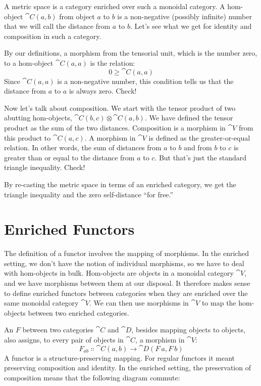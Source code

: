 A metric space is a category enriched over such a monoidal category. A
hom-object $\cat{C}(a, b)$ from object $a$ to $b$ is a
non-negative (possibly infinite) number that we will call the distance
from $a$ to $b$. Let's see what we get for identity and
composition in such a category.

By our definitions, a morphism from the tensorial unit, which is the
number zero, to a hom-object $\cat{C}(a, a)$ is the relation:
\[0 \geqslant \cat{C}(a, a)\]
Since $\cat{C}(a, a)$ is a non-negative number, this condition tells
us that the distance from $a$ to $a$ is always zero.
Check!

Now let's talk about composition. We start with the tensor product of
two abutting hom-objects, $\cat{C}(b, c) \otimes \cat{C}(a, b)$. We have defined
the tensor product as the sum of the two distances. Composition is a
morphism in $\cat{V}$ from this product to $\cat{C}(a, c)$. A morphism
in $\cat{V}$ is defined as the greater-or-equal relation. In other words,
the sum of distances from $a$ to $b$ and from $b$
to $c$ is greater than or equal to the distance from $a$
to $c$. But that's just the standard triangle inequality. Check!

By re-casting the metric space in terms of an enriched category, we get
the triangle inequality and the zero self-distance ``for free.''

\section{Enriched Functors}

The definition of a functor involves the mapping of morphisms. In the
enriched setting, we don't have the notion of individual morphisms, so
we have to deal with hom-objects in bulk. Hom-objects are objects in a
monoidal category $\cat{V}$, and we have morphisms between them at our
disposal. It therefore makes sense to define enriched functors between
categories when they are enriched over the same monoidal category
$\cat{V}$. We can then use morphisms in $\cat{V}$ to map the hom-objects
between two enriched categories.

An  $F$ between two categories $\cat{C}$
and $\cat{D}$, besides mapping objects to objects, also assigns, to every
pair of objects in $\cat{C}$, a morphism in $\cat{V}$:
\[F_{a b} \Colon \cat{C}(a, b) \to \cat{D}(F\ a, F\ b)\]
A functor is a structure-preserving mapping. For regular functors it
meant preserving composition and identity. In the enriched setting, the
preservation of composition means that the following diagram commute:

